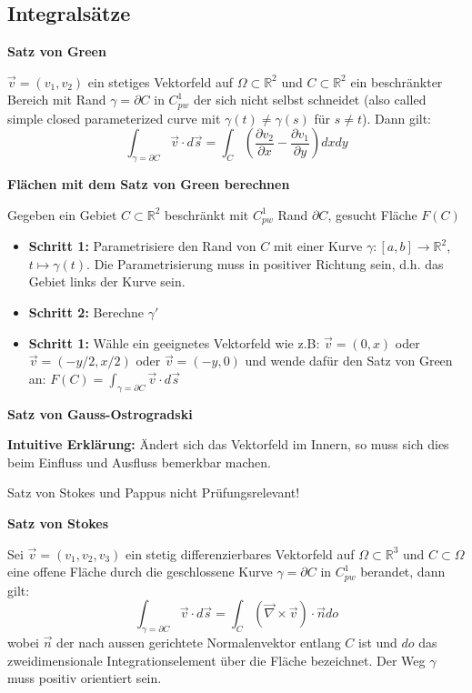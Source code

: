 \documentclass[25pt]{sciposter}
\newcommand{\R}{\mathbb{R}}
\newenvironment{method}[1]{\begin{mdframed}[backgroundcolor=blue!10,innertopmargin=15pt, innerbottommargin=15pt, nobreak=true]
		\textbf{#1 }
	}
	{ 
	\end{mdframed}
}
\newenvironment{important}{\begin{mdframed}[backgroundcolor=red!50,innertopmargin=15pt, innerbottommargin=15pt, nobreak=true]
		\Large
	}
	{ 
	\end{mdframed}
}
\begin{document}
\begin{multicols}{3}
\section*{Integralsätze}

\begin{method}{Satz von Green}
	$\vec{v} = (v_1,v_2)$ ein stetiges Vektorfeld auf $\Omega \subset \R^2$ und $C\subset \R^2$ ein beschränkter Bereich mit Rand $\gamma = \partial C$ in $C_{pw}^1$ der sich nicht selbst schneidet (also called simple closed parameterized curve mit $\gamma(t)\not=\gamma(s)$ für $s\neq t$). Dann gilt:
	$$\int_{\gamma = \partial C} \vec{v} \cdot d\vec{s} = \int_{C} \left( \frac{\partial v_2}{\partial x} -  \frac{\partial v_1}{\partial y}\right)dxdy$$
\end{method}

\begin{method}{Flächen mit dem Satz von Green berechnen}
	Gegeben ein Gebiet $C\subset \R^2$ beschränkt mit $C_{pw}^1$ Rand $\partial C$, gesucht Fläche $F(C)$
	\begin{itemize}
		\item \textbf{Schritt 1:} Parametrisiere den Rand von $C$ mit einer Kurve $\gamma:[a,b]\to \R^2$, $t\mapsto \gamma(t)$. Die Parametrisierung muss in positiver Richtung sein, d.h. das Gebiet links der Kurve sein.
		\item \textbf{Schritt 2:} Berechne $\gamma'$
		\item \textbf{Schritt 1:} Wähle ein geeignetes Vektorfeld wie z.B: $\vec{v} = (0,x)$ oder $\vec{v} = (-y/2,x/2)$ oder $\vec{v} = (-y,0)$ und wende dafür den Satz von Green an: $F(C) = \int_{\gamma=\partial C} \vec{v}\cdot d\vec{s}$
	\end{itemize}
\end{method}




\begin{method}{Satz von Gauss-Ostrogradski}
	
\end{method}
\textbf{Intuitive Erklärung: } Ändert sich das Vektorfeld im Innern, so muss sich dies beim Einfluss und Ausfluss bemerkbar machen.

\ifx

\begin{important}
	Satz von Stokes und Pappus nicht Prüfungsrelevant!
\end{important}

\begin{method}{Satz von Stokes}
	Sei $\vec{v} = (v_1,v_2,v_3)$ ein stetig differenzierbares Vektorfeld auf $\Omega\subset \R^3$ und $C\subset \Omega$ eine offene Fläche durch die geschlossene Kurve $\gamma = \partial C$ in $C_{pw}^1$ berandet, dann gilt:
	$$\int_{\gamma = \partial C} \vec{v}\cdot d\vec{s} = \int_{C} (\vec{\nabla}\times \vec{v}) \cdot\vec{n} do$$ wobei $\vec{n}$ der nach aussen gerichtete Normalenvektor entlang $C$ ist und $do$ das zweidimensionale Integrationselement über die Fläche bezeichnet. Der Weg $\gamma$ muss positiv orientiert sein.
\end{method}


\end{multicols}
\end{document}
